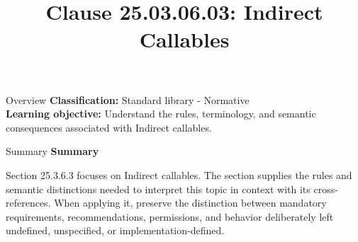 \documentclass[10pt,letterpaper]{article}
\title{Clause 25.03.06.03: Indirect Callables}
\author{}
\date{}
\begin{document}
\maketitle
\begin{CornellOverviewBox}{Overview}
\textbf{Classification:} Standard library - Normative\\[2pt]
\textbf{Learning objective:} Understand the rules, terminology, and semantic consequences associated with Indirect callables.
\end{CornellOverviewBox}\begin{CornellSummaryBox}{Summary}
{\sffamily\bfseries\color{Accent} Summary}\par\vspace{3pt}Section 25.3.6.3 focuses on Indirect callables. The section supplies the rules and semantic distinctions needed to interpret this topic in context with its cross-references. When applying it, preserve the distinction between mandatory requirements, recommendations, permissions, and behavior deliberately left undefined, unspecified, or implementation-defined.
\end{CornellSummaryBox}
\end{document}

